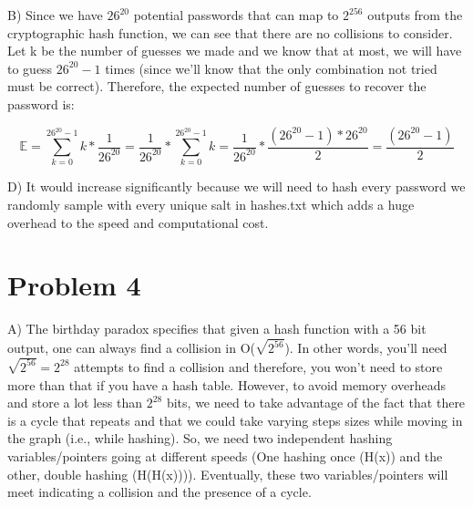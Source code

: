 \documentclass{6160}
\begin{document}
B) Since we have $26^{20}$ potential passwords that can map to $2^{256}$ outputs from the
cryptographic hash function, we can see that there are no collisions to consider.
Let k be the number of guesses we made and we know that at most, we will have to guess 
$26^{20} - 1$ times (since we'll know that the only combination not tried must be correct).
Therefore, the expected number of guesses to recover the password is: 

$$
\mathbb{E} = \sum_{k=0}^{26^{20} - 1} k *  \frac{1}{26^{20}}
= \frac{1}{26^{20}} * \sum_{k=0}^{26^{20} - 1} k = \frac{1}{26^{20}} * \frac{(26^{20} - 1)*26^{20}}{2}
= \frac{(26^{20} - 1)}{2}
$$

D) It would increase significantly because we will need to hash every password we randomly
sample with every unique salt in hashes.txt which adds a huge overhead to the speed 
and computational cost.

\newpage
\section*{Problem 4}

A) The birthday paradox specifies that given a hash function with a 56 bit output,
one can always find a collision in O($\sqrt{2^{56}}$). In other words, you'll need
$\sqrt{2^{56}} = 2^{28}$ attempts to find a collision and therefore, you won't need
to store more than that if you have a hash table. However, to avoid memory overheads and store a
lot less than $2^{28}$ bits, we need to take advantage of the fact that there is a
cycle that repeats and that we could take varying steps sizes while moving in the 
graph (i.e., while hashing). So, we need two independent hashing variables/pointers
going at different speeds (One hashing once (H(x)) and the other, double hashing (H(H(x)))).
Eventually, these two variables/pointers will meet indicating a collision and the 
presence of a cycle.
\end{document}
